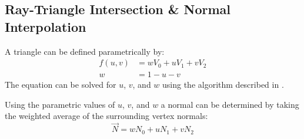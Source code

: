 \subsection{Ray-Triangle Intersection \& Normal Interpolation}
A triangle can be defined parametrically by:
\begin{equation}
\begin{split}
  f(u, v) &= wV_{0} + uV_{1} + vV_{2} \\
  w &= 1 - u - v
\end{split}
\end{equation}
The equation can be solved for $u$, $v$, and $w$ using the algorithm described
in \cite{8_möller_trumbore_1997}.

Using the parametric values of $u$, $v$, and $w$ a normal can be determined by
taking the weighted average of the surrounding vertex normals:
\begin{equation}
  \vec{N} = wN_{0} + uN_{1} + vN_{2}
\end{equation}

